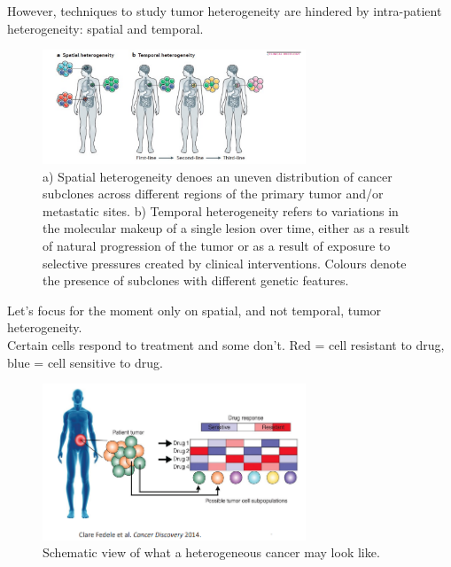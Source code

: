 However, techniques to study tumor heterogeneity are hindered by intra-patient heterogeneity: spatial and temporal. 


\begin{figure}[htbp!]
	\centering
	\includegraphics[width=0.7\textwidth]{heterogeneity.png}
	\caption{\label{fig:hetero} a) Spatial heterogeneity denoes an uneven distribution of cancer subclones across different regions of the primary tumor and/or metastatic sites. b) Temporal heterogeneity refers to variations in the molecular makeup of a single lesion over time, either as a result of natural progression of the tumor or as a result of exposure to selective pressures created by clinical interventions. Colours denote the presence of subclones with different genetic features.}
\end{figure}

Let's focus for the moment only on spatial, and not temporal, tumor heterogeneity. \\
Certain cells respond to treatment and some don't. Red = cell resistant to drug, blue = cell sensitive to drug. 

\begin{figure}[htbp!]
	\centering
	\includegraphics[width=0.7\textwidth]{treatment.png}
	\caption{\label{fig:treatment} Schematic view of what a heterogeneous cancer may look like.}
\end{figure}

